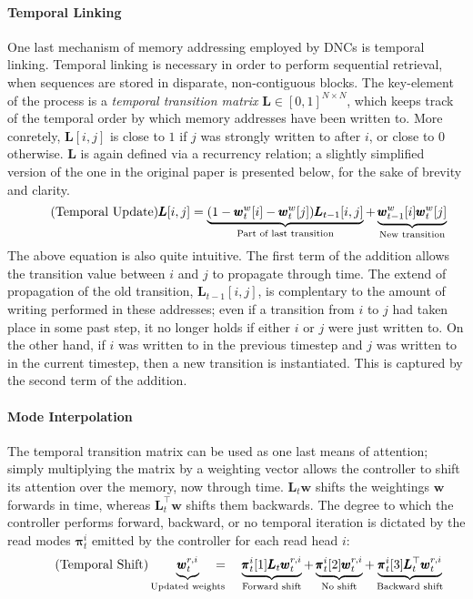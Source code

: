 \documentclass[]{article}
\begin{document}
\paragraph{Temporal Linking} One last mechanism of memory addressing employed by DNCs is temporal linking. Temporal linking is necessary in order to perform sequential retrieval, when sequences are stored in disparate, non-contiguous blocks. The key-element of the process is a \textit{temporal transition matrix} $\pmb{L} \in [0,1]^{N\times N}$, which keeps track of the temporal order by which memory addresses have been written to. More conretely, $\pmb{L}[i,j]$ is close to $1$ if $j$ was strongly written to after $i$, or close to $0$ otherwise. $\pmb{L}$ is again defined via a recurrency relation; a slightly simplified version of the one in the original paper is presented below, for the sake of brevity and clarity.
\[
\tag{Temporal Update}
\pmb{L}[i,j] = \underbrace{(1 - \pmb{w}_t^w[i] - \pmb{w}_t^w[j]) \pmb{L}_{t-1}[i,j]}_{\text{\scriptsize Part of last transition}} + \underbrace{\pmb{w}_{t-1}^w[i] \pmb{w}_{t}^w[j]}_{\text{\scriptsize New transition}}
\]
The above equation is also quite intuitive. The first term of the addition allows the transition value between $i$ and $j$ to propagate through time. The extend of propagation of the old transition, $\pmb{L}_{t-1}[i,j]$, is complentary to the amount of writing performed in these addresses; even if a transition from $i$ to $j$ had taken place in some past step, it no longer holds if either $i$ or $j$ were just written to. On the other hand, if $i$ was written to in the previous timestep and $j$ was written to in the current timestep, then a new transition is instantiated. This is captured by the second term of the addition. 

\paragraph{Mode Interpolation} The temporal transition matrix can be used as one last means of attention; simply multiplying the matrix by a weighting vector allows the controller to shift its attention over the memory, now through time. $\pmb{L}_t \pmb{w}$ shifts the weightings $\pmb{w}$ forwards in time, whereas $\pmb{L}_t^\top \pmb{w}$ shifts them backwards. The degree to which the controller performs forward, backward, or no temporal iteration is dictated by the read modes $\pmb{\pi}_t^i$ emitted by the controller for each read head $i$:
\[
\tag{Temporal Shift}
\underbrace{\pmb{w}_t^{r,i}}_{\text{\scriptsize Updated weights}} \hspace{-10pt} = \quad
\underbrace{\pmb{\pi}_t^i[1] \pmb{L}_t\pmb{w}_t^{r,i}}_{\text{\scriptsize Forward shift}} + 
\underbrace{\pmb{\pi}_t^i[2] \pmb{w}_t^{r,i}}_{\text{\scriptsize No shift}} + 
\underbrace{\pmb{\pi}_t^i[3] \pmb{L}_t^\top \pmb{w}_t^{r,i}}_{\text{\scriptsize Backward shift}}
\]
\end{document}
